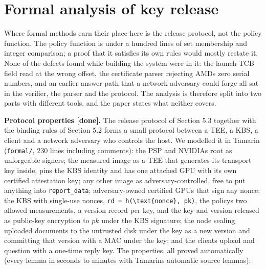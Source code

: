 \documentclass[letterpaper,twocolumn,10pt]{article}
\begin{document}
\section{Formal analysis of key release}\label{formal-analysis-of-key-release}

Where formal methods earn their place here is the release protocol, not the policy function. The policy function is under a hundred lines of set membership and integer comparison; a proof that it satisfies its own rules would mostly restate it. None of the defects found while building the system were in it: the launch-TCB field read at the wrong offset, the certificate parser rejecting AMD\textquotesingle s zero serial numbers, and an earlier answer path that a network adversary could forge all sat in the verifier, the parser and the protocol. The analysis is therefore split into two parts with different tools, and the paper states what neither covers.

\textbf{Protocol properties {[}done{]}.} The release protocol of Section 5.3 together with the binding rules of Section 5.2 forms a small protocol between a TEE, a KBS, a client and a network adversary who controls the host. We modelled it in Tamarin (\texttt{formal/}, 230 lines including comments): the PSP and NVIDIA\textquotesingle s root as unforgeable signers; the measured image as a TEE that generates its transport key inside, pins the KBS identity and has one attached GPU with its own certified attestation key; any other image as adversary-controlled, free to put anything into \texttt{report\_data}; adversary-owned certified GPUs that sign any nonce; the KBS with single-use nonces, \texttt{rd\ =\ h(\textbackslash{}text\{nonce\},\ pk)}, the policy\textquotesingle s two allowed measurements, a version record per key, and the key and version released as public-key encryption to \(pk\) under the KBS signature; the node sealing uploaded documents to the untrusted disk under the key as a new version and committing that version with a MAC under the key; and the client\textquotesingle s upload and question with a one-time reply key. The properties, all proved automatically (every lemma in seconds to minutes with Tamarin\textquotesingle s automatic source lemmas):
\end{document}
